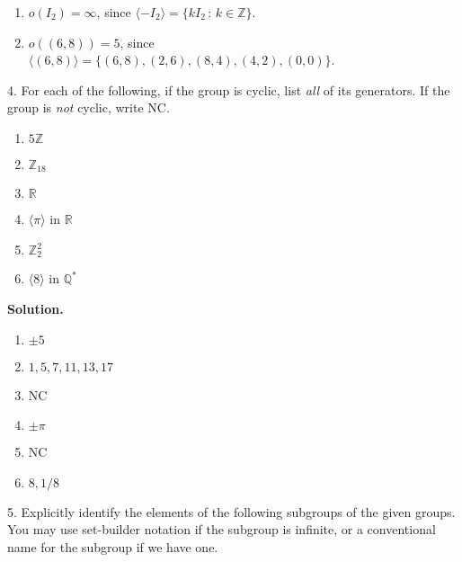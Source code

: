 \documentclass[10pt,]{book}
\theoremstyle{plain}
\theoremstyle{definition}
\theoremstyle{definition}
\theoremstyle{definition}
\theoremstyle{definition}
\numberwithin{equation}{section}
\def\Z{\mathbb{Z}}
\def\R{\mathbb{R}}
\def\Q{\mathbb{Q}}
\def\C{\mathbb{C}}
\begin{document}
\begin{exerciselist}
\begin{enumerate}[label=(\alph*)]
\item\hypertarget{li-295}{}\(o(I_2)=\infty\), since \(\langle -I_2\rangle =\{kI_2\,:\,k\in \Z\}\).%
\item\hypertarget{li-296}{}\(o((6,8))=5\), since \(\langle (6,8)\rangle =\{(6,8),(2,6),(8,4),(4,2),(0,0)\}\).%
\end{enumerate}
%
\item[4.]\hypertarget{exercise-37}{}For each of the following, if the group is cyclic, list \emph{all} of its generators. If the group is \emph{not} cyclic, write NC. \leavevmode%
\begin{enumerate}[label=(\alph*)]
\item\hypertarget{li-297}{}\(5\Z\)%
\item\hypertarget{li-298}{}\(\Z_{18}\)%
\item\hypertarget{li-299}{}\(\R\)%
\item\hypertarget{li-300}{}\(\langle \pi\rangle\) in \(\R\)%
\item\hypertarget{li-301}{}\(\Z_2^2\)%
\item\hypertarget{li-302}{}\(\langle 8\rangle\) in \(\Q^*\)%
\end{enumerate}
%
\par\smallskip
\par\smallskip
\noindent\textbf{Solution.}\hypertarget{solution-37}{}\quad
\leavevmode%
\begin{enumerate}[label=(\alph*)]
\item\hypertarget{li-303}{}\(\pm 5\)%
\item\hypertarget{li-304}{}\(1,5,7,11,13,17\)%
\item\hypertarget{li-305}{}NC%
\item\hypertarget{li-306}{}\(\pm \pi\)%
\item\hypertarget{li-307}{}NC%
\item\hypertarget{li-308}{}\(8,1/8\)%
\end{enumerate}
%
\item[5.]\hypertarget{exercise-38}{}Explicitly identify the elements of the following subgroups of the given groups. You may use set-builder notation if the subgroup is infinite, or a conventional name for the subgroup if we have one. \leavevmode%
\begin{enumerate}[label=(\alph*)]
\item\hypertarget{li-309}{}\(\langle 3\rangle\) in \(\Z\)%
\item\hypertarget{li-310}{}\(\langle i\rangle\) in \(\C^*\)%
\item\hypertarget{li-311}{}\(\langle A\rangle\), for \(A=\left[ \begin{array}{cc}

\end{array}
\end{enumerate}
\end{exerciselist}
\end{document}

